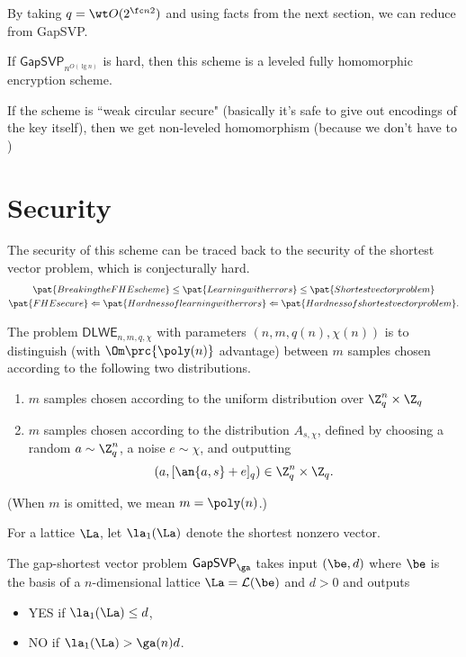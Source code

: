 By taking $q=\wt O(2^{\fc n2})$ and using facts from the next section, we can reduce from GapSVP.
\begin{thm}
If $\mathsf{GapSVP}_{n^{O(\lg n)}}$ is hard, then this scheme is a leveled fully homomorphic encryption scheme.
\end{thm}
If the scheme is ``weak circular secure" (basically it's safe to give out encodings of the key itself), then we get non-leveled homomorphism (because we don't have to )



\section{Security}

The security of this scheme can be traced back to the security of the shortest vector problem, which is conjecturally hard. 
\begin{gather*}
\pat{Breaking the FHE scheme} \le 
\pat{Learning with errors}\le 
\pat{Shortest vector problem}\\
\pat{FHE secure} \Leftarrow 
\pat{Hardness of learning with errors}\Leftarrow 
\pat{Hardness of shortest vector problem}.
\end{gather*}


\begin{df}
The  problem $\mathsf{DLWE}_{n,m,q,\chi}$ with parameters $(n,m,q(n),\chi(n))$ is to 
distinguish (with $\Om\prc{\poly(n)}$ advantage) between $m$ samples chosen according to the following two distributions.
\begin{enumerate}
\item
$m$ samples chosen according to the uniform distribution over $\Z_q^n\times \Z_q$
\item
$m$ samples chosen according to the distribution $A_{s,\chi}$, defined by choosing a random $a\sim \Z_q^n$, a noise $e\sim \chi$, and outputting 
\[
(a,[\an{a,s}+e]_q)\in \Z_q^n\times \Z_q.
\]
\end{enumerate}
(When $m$ is omitted, we mean $m=\poly(n)$.)
\end{df}

\begin{df}
For a lattice $\La$, let $\la_1(\La)$ denote the shortest nonzero vector.

The gap-shortest vector problem $\mathsf{GapSVP}_{\ga}$ takes input 
$
(\be%
, d)
$
where $\be$ is the basis of a $n$-dimensional lattice $\La=\cal L(\be)$ and $d>0$ and outputs
\begin{itemize}
\item
YES if $\la_1(\La)\le d$,
\item
NO if $\la_1(\La)>\ga(n)d$.
\end{itemize}
\end{df}

